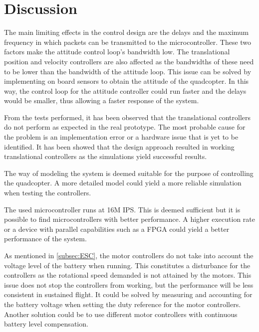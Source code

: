 \chapter{Discussion}
The main limiting effects in the control design are the delays and the maximum frequency in which packets can be transmitted to the microcontroller. These two factors make the attitude control loop's bandwidth low. The translational position and velocity controllers are also affected as the bandwidths of these need to be lower than the bandwidth of the attitude loop. This issue can be solved by implementing on board sensors to obtain the attitude of the quadcopter. In this way, the control loop for the attitude controller could run faster and the delays would be smaller, thus allowing a faster response of the system.

From the tests performed, it has been observed that the translational controllers do not perform as expected in the real prototype. The most probable cause for the problem is an implementation error or a hardware issue that is yet to be identified. It has been showed that the design approach resulted in working translational controllers as the simulations yield successful results. 

The way of modeling the system is deemed suitable for the purpose of controlling the quadcopter. A more detailed model could yield a more reliable simulation when testing the controllers.

The used microcontroller runs at 16M IPS. This is deemed sufficient but it is possible to find microcontrollers with better performance. A higher execution rate or a device with parallel capabilities such as a FPGA could yield a better performance of the system. 

As mentioned in \autoref{subsec:ESC}, the motor controllers do not take into account the voltage level of the battery when running. This constitutes a disturbance for the controllers as the rotational speed demanded is not attained by the motors. This issue does not stop the controllers from working, but the performance will be less consistent in sustained flight. It could be solved by measuring and accounting for the battery voltage when setting the duty reference for the motor controllers. Another solution could be to use different motor controllers with continuous battery level compensation.



